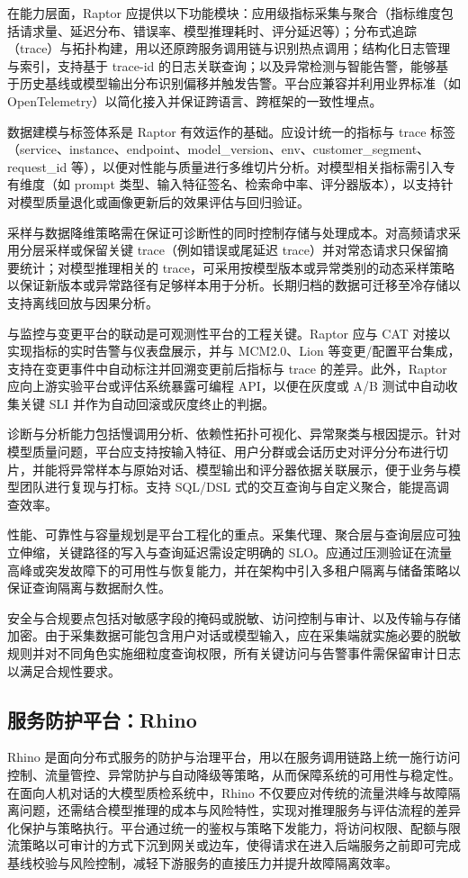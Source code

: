 在能力层面，Raptor 应提供以下功能模块：应用级指标采集与聚合（指标维度包括请求量、延迟分布、错误率、模型推理耗时、评分延迟等）；分布式追踪（trace）与拓扑构建，用以还原跨服务调用链与识别热点调用；结构化日志管理与索引，支持基于 trace-id 的日志关联查询；以及异常检测与智能告警，能够基于历史基线或模型输出分布识别偏移并触发告警。平台应兼容并利用业界标准（如 OpenTelemetry）以简化接入并保证跨语言、跨框架的一致性埋点。

数据建模与标签体系是 Raptor 有效运作的基础。应设计统一的指标与 trace 标签（service、instance、endpoint、model\_version、env、customer\_segment、request\_id 等），以便对性能与质量进行多维切片分析。对模型相关指标需引入专有维度（如 prompt 类型、输入特征签名、检索命中率、评分器版本），以支持针对模型质量退化或画像更新后的效果评估与回归验证。

采样与数据降维策略需在保证可诊断性的同时控制存储与处理成本\cite{fi14100274}。对高频请求采用分层采样或保留关键 trace（例如错误或尾延迟 trace）并对常态请求只保留摘要统计；对模型推理相关的 trace，可采用按模型版本或异常类别的动态采样策略以保证新版本或异常路径有足够样本用于分析。长期归档的数据可迁移至冷存储以支持离线回放与因果分析。

与监控与变更平台的联动是可观测性平台的工程关键。Raptor 应与 CAT 对接以实现指标的实时告警与仪表盘展示\cite{9837035}，并与 MCM2.0、Lion 等变更/配置平台集成，支持在变更事件中自动标注并回溯变更前后指标与 trace 的差异。此外，Raptor 应向上游实验平台或评估系统暴露可编程 API，以便在灰度或 A/B 测试中自动收集关键 SLI 并作为自动回滚或灰度终止的判据。

诊断与分析能力包括慢调用分析、依赖性拓扑可视化、异常聚类与根因提示。针对模型质量问题，平台应支持按输入特征、用户分群或会话历史对评分分布进行切片，并能将异常样本与原始对话、模型输出和评分器依据关联展示，便于业务与模型团队进行复现与打标。支持 SQL/DSL 式的交互查询与自定义聚合，能提高调查效率。

性能、可靠性与容量规划是平台工程化的重点。采集代理、聚合层与查询层应可独立伸缩，关键路径的写入与查询延迟需设定明确的 SLO\cite{bhanuprakash_madupati_2023_13951033}。应通过压测验证在流量高峰或突发故障下的可用性与恢复能力，并在架构中引入多租户隔离与储备策略以保证查询隔离与数据耐久性。

安全与合规要点包括对敏感字段的掩码或脱敏、访问控制与审计、以及传输与存储加密。由于采集数据可能包含用户对话或模型输入，应在采集端就实施必要的脱敏规则并对不同角色实施细粒度查询权限，所有关键访问与告警事件需保留审计日志以满足合规性要求。

\subsection{服务防护平台：Rhino}
Rhino 是面向分布式服务的防护与治理平台，用以在服务调用链路上统一施行访问控制、流量管控、异常防护与自动降级等策略，从而保障系统的可用性与稳定性。在面向人机对话的大模型质检系统中，Rhino 不仅要应对传统的流量洪峰与故障隔离问题，还需结合模型推理的成本与风险特性，实现对推理服务与评估流程的差异化保护与策略执行。平台通过统一的鉴权与策略下发能力，将访问权限、配额与限流策略以可审计的方式下沉到网关或边车，使得请求在进入后端服务之前即可完成基线校验与风险控制，减轻下游服务的直接压力并提升故障隔离效率。


